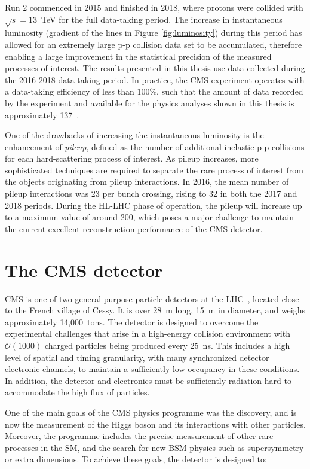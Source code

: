 Run 2 commenced in 2015 and finished in 2018, where protons were collided with $\sqrt{s}=13$~TeV for the full data-taking period. The increase in instantaneous luminosity (gradient of the lines in Figure \ref{fig:luminosity}) during this period has allowed for an extremely large p-p collision data set to be accumulated, therefore enabling a large improvement in the statistical precision of the measured processes of interest. The results presented in this thesis use data collected during the 2016-2018 data-taking period. In practice, the CMS experiment operates with a data-taking efficiency of less than $100$\%, such that the amount of data recorded by the experiment and available for the physics analyses shown in this thesis is approximately 137~\fbinv.

One of the drawbacks of increasing the instantaneous luminosity is the enhancement of \textit{pileup}, defined as the number of additional inelastic p-p collisions for each hard-scattering process of interest. As pileup increases, more sophisticated techniques are required to separate the rare process of interest from the objects originating from pileup interactions. In 2016, the mean number of pileup interactions was 23 per bunch crossing, rising to 32 in both the 2017 and 2018 periods. During the HL-LHC phase of operation, the pileup will increase up to a maximum value of around 200, which poses a major challenge to maintain the current excellent reconstruction performance of the CMS detector.

\section{The CMS detector}\label{sec:cms}
CMS is one of two general purpose particle detectors at the LHC~\cite{Chatrchyan:2008zzk}, located close to the French village of Cessy. It is over 28~m long, 15~m in diameter, and weighs approximately 14,000~tons. The detector is designed to overcome the experimental challenges that arise in a high-energy collision environment with $\mathcal{O}(1000)$ charged particles being produced every 25~ns. This includes a high level of spatial and timing granularity, with many synchronized detector electronic channels, to maintain a sufficiently low occupancy in these conditions. In addition, the detector and electronics must be sufficiently radiation-hard to accommodate the high flux of particles.

One of the main goals of the CMS physics programme was the discovery, and is now the measurement of the Higgs boson and its interactions with other particles. Moreover, the programme includes the precise measurement of other rare processes in the SM, and the search for new BSM physics such as supersymmetry or extra dimensions. To achieve these goals, the detector is designed to:

